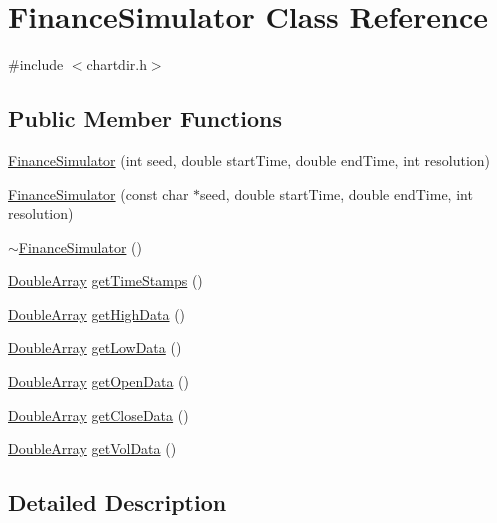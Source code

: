 \hypertarget{class_finance_simulator}{}\section{Finance\+Simulator Class Reference}
\label{class_finance_simulator}


{\ttfamily \#include $<$chartdir.\+h$>$}

\subsection*{Public Member Functions}
\begin{DoxyCompactItemize}
\item 
\hyperlink{class_finance_simulator_a5bb9533a4116a6cdce8004448c8a1a6d}{Finance\+Simulator} (int seed, double start\+Time, double end\+Time, int resolution)
\item 
\hyperlink{class_finance_simulator_a8ef2341c687fba400c23a498172bdcca}{Finance\+Simulator} (const char $\ast$seed, double start\+Time, double end\+Time, int resolution)
\item 
\hyperlink{class_finance_simulator_a262287be86cd988ef6931485040ab290}{$\sim$\+Finance\+Simulator} ()
\item 
\hyperlink{class_double_array}{Double\+Array} \hyperlink{class_finance_simulator_aa3422b709846c868c79e7f7e60ede601}{get\+Time\+Stamps} ()
\item 
\hyperlink{class_double_array}{Double\+Array} \hyperlink{class_finance_simulator_a94b47db17544db3e9f49f34ed4063949}{get\+High\+Data} ()
\item 
\hyperlink{class_double_array}{Double\+Array} \hyperlink{class_finance_simulator_aba8c5020220b871f5a599d4424fc0697}{get\+Low\+Data} ()
\item 
\hyperlink{class_double_array}{Double\+Array} \hyperlink{class_finance_simulator_aed86f3c9c364cb0ddfb7880c81a591f5}{get\+Open\+Data} ()
\item 
\hyperlink{class_double_array}{Double\+Array} \hyperlink{class_finance_simulator_a3c85f600cc321db2f07de6e79455b1d5}{get\+Close\+Data} ()
\item 
\hyperlink{class_double_array}{Double\+Array} \hyperlink{class_finance_simulator_ad0ff79eb418099f467eed27305d00b7a}{get\+Vol\+Data} ()
\end{DoxyCompactItemize}


\subsection{Detailed Description}



